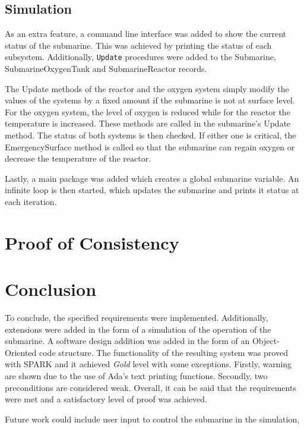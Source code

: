 \documentclass{llncs}
\begin{document}
\subsection{Simulation}
As an extra feature, a command line interface was added to show the current status of the submarine. This was achieved by printing the status of each subsystem. Additionally, \texttt{Update} procedures were added to the Submarine, SubmarineOxygenTank and SubmarineReactor records. 

The Update methods of the reactor and the oxygen system simply modify the values of the systems by a fixed amount if the submarine is not at surface level. For the oxygen system, the level of oxygen is reduced while for the reactor the temperature is increased. These methods are called in the submarine's Update method. The status of both systems is then checked. If either one is critical, the EmergencySurface method is called so that the submarine can regain oxygen or decrease the temperature of the reactor. 

Lastly, a main package was added which creates a global submarine variable. An infinite loop is then started, which updates the submarine and prints it status at each iteration.

\section{Proof of Consistency}
\section{Conclusion}
To conclude, the specified requirements were implemented. Additionally, extensions were added in the form of a simulation of the operation of the submarine. A software design addition was added in the form of an Object-Oriented code structure. The functionality of the resulting system was proved with SPARK and it achieved \textit{Gold} level with some exceptions. Firstly, warning are shown due to the use of Ada's text printing functions. Secondly, two preconditions are considered weak. Overall, it can be said that the requirements were met and a satisfactory level of proof was achieved.

Future work could include user input to control the submarine in the simulation, 
\end{document}
